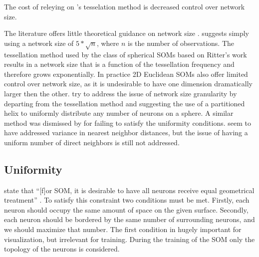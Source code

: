\documentclass[11pt]{article}
\begin{document}
The cost of releying on 's tesselation method is decreased
control over network size.

The literature offers little theoretical guidance on network size
\citep{cho1996}.  \cite{toolbox} suggests simply using a network size of
\(5*\sqrt {n}\), where \(n\) is the number of observations.  The tessellation
method used by the class of spherical SOMs based on Ritter's work results in a
network size that is a function of the tessellation frequency and therefore
grows exponentially. In practice 2D Euclidean SOMs also offer limited control
over network size, as it is undesirable to have one dimension dramatically
larger then the other.  \cite{Nishio:2006fk} try to address the issue of network
size granularity by departing from the tessellation method and suggesting the
use of a partitioned helix to uniformly distribute any number of neurons on a
sphere.  A similar method was dismissed by \cite{wu2005} for failing to satisfy
the uniformity conditions.  \citeauthor{Nishio:2006fk} seem to have addressed
variance in nearest neighbor distances, but the issue of having a uniform number
of direct neighbors is still not addressed.

\subsection{Uniformity}
\citeauthor{wu2006} state that ``[f]or SOM, it is desirable to have all neurons
receive equal geometrical treatment'' \cite[pp. 900]{wu2006}.  To satisfy this
constraint two conditions must be met.  Firstly, each neuron should occupy the
same amount of space on the given surface.  Secondly, each neuron should be
bordered by the same number of surrounding neurons, and we should maximize 
that number.  The first condition in hugely important for visualization, but 
irrelevant for training.  During the training of the SOM only the topology of the 
neurons is considered.
\end{document}
